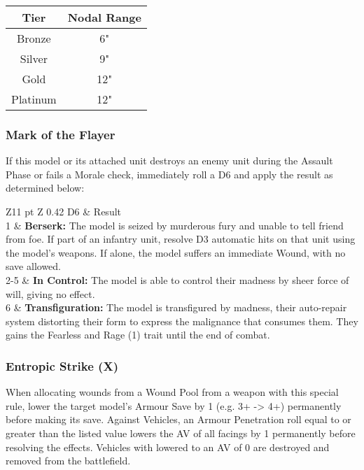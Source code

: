 \begin{multicols}{2}
\label{Nodal Range}
\begin{tabular}{|c|c|}
	\hline
	Tier & Nodal Range \\
	\hline
	Bronze & 6" \\
	Silver & 9" \\
	Gold & 12" \\
	Platinum & 12" \\
	\hline
\end{tabular}

\subsubsection{Mark of the Flayer} \label{Mark of the Flayer}

If this model or its attached unit destroys an enemy unit during the Assault Phase or fails a Morale check, immediately roll a D6 and apply the result as determined below: \\
\begin{tabular}{Z{11 pt} Z {0.42\textwidth}}
	D6 & Result \\
	1 & \textbf{Berserk:} The model is seized by murderous fury and unable to tell friend from foe. If part of an infantry unit, resolve D3 automatic hits on that unit using the model's weapons. If alone, the model suffers an immediate Wound, with no save allowed. \\
	2-5 & \textbf{In Control:} The model is able to control their madness by sheer force of will, giving no effect. \\
	6 & \textbf{Transfiguration:} The model is transfigured by madness, their auto-repair system distorting their form to express the malignance that consumes them. They gains the Fearless and Rage (1) trait until the end of combat. \\
\end{tabular}


\subsubsection{Entropic Strike (X)} \label{Entropic Strike}

When allocating wounds from a Wound Pool from a weapon with this special rule, lower the target model's Armour Save by 1 (e.g. 3+ -> 4+) permanently before making its save. Against Vehicles, an Armour Penetration roll equal to or greater than the listed value lowers the AV of all facings by 1 permanently before resolving the effects. Vehicles with lowered to an AV of 0 are destroyed and removed from the battlefield.


\end{multicols}
